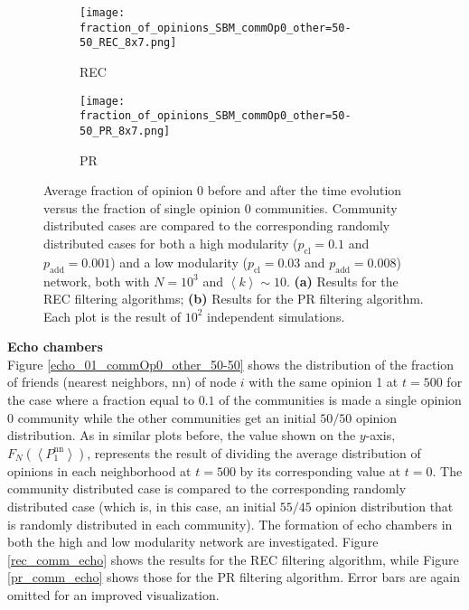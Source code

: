 \documentclass[11 pt , letterpaper , twoside , openright]{book}
\begin{document}
\begin{figure}[H]
  \begin{subfigure}[b]{0.49\textwidth}
  	\texttt{[image: fraction\_of\_opinions\_SBM\_commOp0\_other=50-50\_REC\_8x7.png]}
    \caption{REC}
    \label{rec_comm}
  \end{subfigure}
  \begin{subfigure}[b]{0.49\textwidth}
  	\texttt{[image: fraction\_of\_opinions\_SBM\_commOp0\_other=50-50\_PR\_8x7.png]}
    \caption{PR}
    \label{pr_comm}
  \end{subfigure}
  \captionsetup{format=plain}
  \caption[Average fraction of opinion 0 before and after the time evolution versus the fraction of single opinion 0 communities. Community distributed cases are compared to the corresponding randomly distributed cases for both a high modularity and a low modularity network. Results for the REC and PR filtering algorithm.]{Average fraction of opinion 0 before and after the time evolution versus the fraction of single opinion 0 communities. Community distributed cases are compared to the corresponding randomly distributed cases for both a high modularity ($p_{\text{cl}} = 0.1$ and $p_{\text{add}} = 0.001$) and a low modularity ($p_{\text{cl}} = 0.03$ and $p_{\text{add}} = 0.008$) network, both with $N=10^3$ and $\left<k\right> \sim 10$. \textbf{(a)} Results for the REC filtering algorithms; \textbf{(b)} Results for the PR filtering algorithm. Each plot is the result of $10^2$ independent simulations.}
\label{fracOp0_vs_commOp0_other_50-50}
\end{figure}
\newpage
\noindent
\textbf{Echo chambers}\\
\newline
Figure \ref{echo_01_commOp0_other_50-50} shows the distribution of the fraction of friends (nearest neighbors, nn) of node $i$ with the same opinion 1 at $t=500$ for the case where a fraction equal to $0.1$ of the communities is made a single opinion 0 community while the other communities get an initial $50/50$ opinion distribution. As in similar plots before, the value shown on the $y$-axis, $F_N(\left<P_1^{\text{nn}}\right>)$, represents the result of dividing the average distribution of opinions in each neighborhood at $t=500$ by its corresponding value at $t=0$. The community distributed case is compared to the corresponding randomly distributed case (which is, in this case, an initial $55/45$ opinion distribution that is randomly distributed in each community). The formation of echo chambers in both the high and low modularity network are investigated. Figure \ref{rec_comm_echo} shows the results for the REC filtering algorithm, while Figure \ref{pr_comm_echo} shows those for the PR filtering algorithm. Error bars are again omitted for an improved visualization.\\
\end{document}
